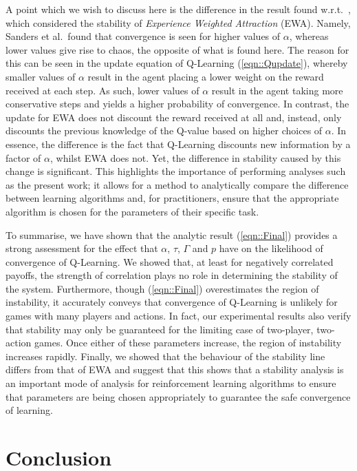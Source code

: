 \documentclass[sigconf,anonymous]{aamas}
\begin{document}
A point which we wish to discuss here is the difference in the result found w.r.t.~\cite{Sanders2018}, which considered the stability of \textit{Experience Weighted Attraction} (EWA). Namely, Sanders et al.~found that convergence is seen for higher values of $\alpha$, whereas lower values give rise to chaos, the opposite of what is found here. The reason for this can be seen in the update equation of Q-Learning (\ref{eqn::Qupdate}), whereby
smaller values of $\alpha$ result in the agent placing a lower weight on the reward received at each step. As such, lower values of $\alpha$ result in the agent taking more conservative steps and yields a higher probability of convergence. In contrast, the update for EWA does not discount the reward received at all and, instead, only discounts the previous knowledge of the Q-value based on higher choices of $\alpha$. In essence, the difference is the fact that Q-Learning discounts new information by a factor of $\alpha$, whilst EWA does not. Yet, the difference in stability caused by this change is significant. This highlights the importance of performing analyses such as the present work; it allows for a method to analytically compare the difference between learning algorithms and, for practitioners, ensure that the appropriate algorithm is chosen for the parameters of their specific task.


To summarise, we have shown that the analytic result
(\ref{eqn::Final}) provides a strong assessment for the effect that
$\alpha$, $\tau$, $\Gamma$ and $p$ have on the likelihood of
convergence of Q-Learning. We showed that, at least for negatively
correlated payoffs, the strength of correlation plays no role in
determining the stability of the system. Furthermore, though
(\ref{eqn::Final}) overestimates the region of instability, it
accurately conveys that convergence of Q-Learning is unlikely for
games with many players and actions. In fact, our experimental results
also verify that stability may only be guaranteed for the limiting
case of two-player, two-action games. Once either of these parameters increase, the region of instability increases rapidly.
%
Finally, we showed that the behaviour of the stability line differs
from that of EWA and suggest that this shows that a stability analysis
is an important mode of analysis for reinforcement learning algorithms
to ensure that parameters are being chosen appropriately to guarantee
the safe convergence of learning.

\section{Conclusion}
\end{document}

